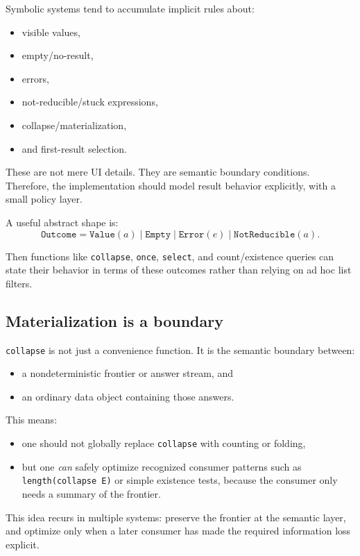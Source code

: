 \documentclass[11pt]{article}
\begin{document}
Symbolic systems tend to accumulate implicit rules about:
\begin{itemize}
    \item visible values,
    \item empty/no-result,
    \item errors,
    \item not-reducible/stuck expressions,
    \item collapse/materialization,
    \item and first-result selection.
\end{itemize}

These are not mere UI details. They are semantic boundary conditions. Therefore, the implementation should model result behavior explicitly, with a small policy layer.

A useful abstract shape is:
\[
\texttt{Outcome} =
\texttt{Value}(a)
\mid
\texttt{Empty}
\mid
\texttt{Error}(e)
\mid
\texttt{NotReducible}(a).
\]

Then functions like \texttt{collapse}, \texttt{once}, \texttt{select}, and count/existence queries can state their behavior in terms of these outcomes rather than relying on ad hoc list filters.

\subsection{Materialization is a boundary}

\texttt{collapse} is not just a convenience function. It is the semantic boundary between:
\begin{itemize}
    \item a nondeterministic frontier or answer stream, and
    \item an ordinary data object containing those answers.
\end{itemize}

This means:
\begin{itemize}
    \item one should not globally replace \texttt{collapse} with counting or folding,
    \item but one \emph{can} safely optimize recognized consumer patterns such as \texttt{length(collapse E)} or simple existence tests, because the consumer only needs a summary of the frontier.
\end{itemize}

This idea recurs in multiple systems: preserve the frontier at the semantic layer, and optimize only when a later consumer has made the required information loss explicit.
\end{document}
